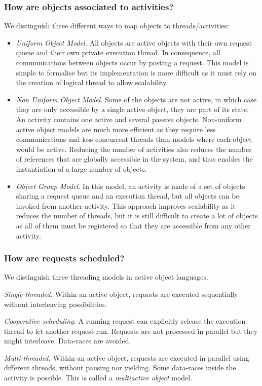 \subsubsection{How are objects associated to activities?}\label{sec:activity}
We distinguish three different ways to map objects to threads/activities: 
\begin{itemize}
	\item \textit{Uniform Object Model.}  All objects are active objects
	with their own request queue and their own private execution thread.
	In consequence, all communications between objects occur by posting
	a request. This model is simple to formalise but its implementation
	is more difficult as it must rely on the creation of logical thread
	to allow scalability.
	\item \textit{Non Uniform Object Model.}  Some of the objects are not
	active, in which case they are only accessible by a single active
	object, they are part of its state. 
	An activity contains one active and several passive objects. Non-uniform active object models
	are much more efficient as they require less communications and
	less concurrent threads than models where each object would be
	active. Reducing the number of activities also reduces the number of
	references that are globally accessible in the system, and thus enables the
	instantiation of a large number of objects.
	\item \textit{Object Group Model.}
	In this model, an activity is made of a set of objects sharing a
	request queue and an execution thread, but all
	objects can be invoked from another activity. This
	approach improves scalability as it reduces the number of threads, but
	it is still difficult to create a lot of objects as all of them must
	be registered so that they are accessible from any other activity.
\end{itemize}

\subsubsection{How are requests scheduled?}
We distinguish three  threading models in active object languages.
\begin{description}
	\item \textit{Single-threaded.} 
	Within an active object, requests are executed sequentially without
	interleaving possibilities. 
	\item \textit{Cooperative scheduling.}
	A running request can explicitly release the execution thread to let
	another request run. Requests are not processed in parallel but they
	might interleave. Data-races are avoided.
	\item \textit{Multi-threaded.}
	Within an active object, requests are executed in parallel using
	different threads, without pausing nor yielding.
	Some data-races inside the activity is possible. This is
	called a \emph{multiactive object} model.
\end{description}

